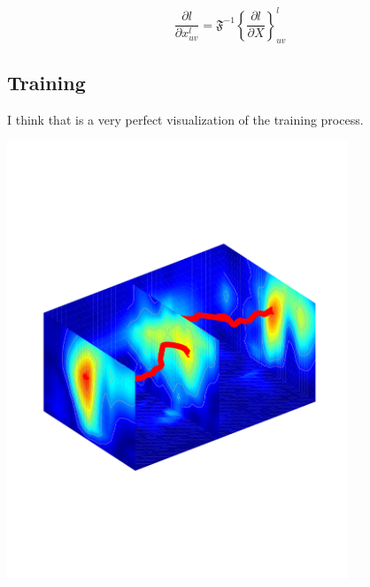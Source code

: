 \documentclass[11pt]{article}
\begin{document}
$$
\frac{\partial l}{\partial x_{uv}^{l}}
=\mathfrak{F}^{-1} \left\{ \frac{\partial l}{\partial X}\right\}_{uv}^l
$$

\subsection{Training}

I think that is a very perfect visualization of the training process.

\begin{center}
\includegraphics[width=4in,trim = 0mm 65mm 0mm 65mm, clip]{./img/visual_training.pdf}
\end{center}

\pagebreak		


\end{document}
